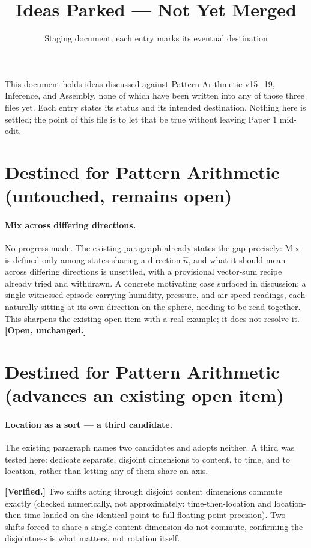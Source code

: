 \documentclass[11pt]{article}
\title{Ideas Parked --- Not Yet Merged}
\author{Staging document; each entry marks its eventual destination}
\date{}
\begin{document}
\maketitle

\noindent This document holds ideas discussed against Pattern Arithmetic
v15\_19, Inference, and Assembly, none of which have been written into
any of those three files yet. Each entry states its status and its
intended destination. Nothing here is settled; the point of this file
is to let that be true without leaving Paper 1 mid-edit.

\section{Destined for Pattern Arithmetic (untouched, remains open)}

\paragraph{Mix across differing directions.} No progress made. The
existing paragraph already states the gap precisely: Mix is defined
only among states sharing a direction $\hat n$, and what it should mean
across differing directions is unsettled, with a provisional
vector-sum recipe already tried and withdrawn. A concrete motivating
case surfaced in discussion: a single witnessed episode carrying
humidity, pressure, and air-speed readings, each naturally sitting at
its own direction on the sphere, needing to be read together. This
sharpens the existing open item with a real example; it does not
resolve it. \textbf{[Open, unchanged.]}

\section{Destined for Pattern Arithmetic (advances an existing open item)}

\paragraph{Location as a sort --- a third candidate.} The existing
paragraph names two candidates and adopts neither. A third was tested
here: dedicate separate, disjoint dimensions to content, to time, and
to location, rather than letting any of them share an axis.

\textbf{[Verified.]} Two shifts acting through disjoint content
dimensions commute exactly (checked numerically, not approximately:
time-then-location and location-then-time landed on the identical
point to full floating-point precision). Two shifts forced to share a
single content dimension do not commute, confirming the disjointness
is what matters, not rotation itself.
\end{document}
